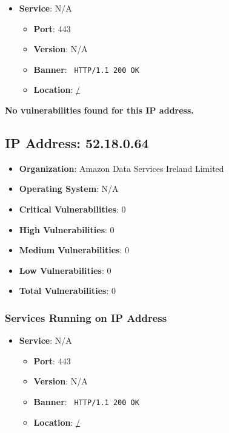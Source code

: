 \documentclass{article}
\begin{document}
\begin{itemize}
    
        \item \textbf{Service}: N/A
        \begin{itemize}
            \item \textbf{Port}: 443
            \item \textbf{Version}:  N/A 
            \item \textbf{Banner}: \texttt{
                HTTP/1.1 200 OK
            }
            \item \textbf{Location}: \href{ / }{ / }
        \end{itemize}
    
\end{itemize}


\textbf{No vulnerabilities found for this IP address.}




\clearpage



\subsection*{IP Address: 52.18.0.64}

\begin{itemize}
    \item \textbf{Organization}: Amazon Data Services Ireland Limited
    \item \textbf{Operating System}:  N/A 
    \item \textbf{Critical Vulnerabilities}: 0
    \item \textbf{High Vulnerabilities}: 0
    \item \textbf{Medium Vulnerabilities}: 0
    \item \textbf{Low Vulnerabilities}: 0
    \item \textbf{Total Vulnerabilities}: 0
\end{itemize}

\subsubsection*{Services Running on IP Address}

\begin{itemize}
    
        \item \textbf{Service}: N/A
        \begin{itemize}
            \item \textbf{Port}: 443
            \item \textbf{Version}:  N/A 
            \item \textbf{Banner}: \texttt{
                HTTP/1.1 200 OK
            }
            \item \textbf{Location}: \href{ / }{ / }
        \end{itemize}
    
\end{itemize}
\end{document}
